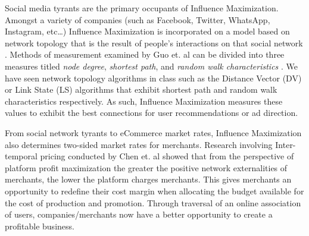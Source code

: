 \documentclass[12pt]{article}
\begin{document}
Social media tyrants are the primary occupants of Influence Maximization. 
Amongst a variety of companies (such as Facebook, Twitter, WhatsApp, Instagram, etc\ldots) Influence Maximization is incorporated on a model based on network topology that is the result of people's interactions on that social network \cite{9045797}. 
Methods of measurement examined by Guo et. al can be divided into three measures titled \emph{node degree}, \emph{shortest path}, and \emph{random walk characteristics} \cite{9045797}. 
We have seen network topology algorithms in class such as the Distance Vector (DV) or Link State (LS) algorithms that exhibit shortest path and random walk characteristics respectively. 
As such, Influence Maximization measures these values to exhibit the best connections for user recommendations or ad direction.

From social network tyrants to eCommerce market rates, Influence Maximization also determines two-sided market rates for merchants. 
Research involving Inter-temporal pricing conducted by Chen et. al \cite{9188557} showed that from the perspective of platform profit maximization the greater the positive network externalities of merchants, the lower the platform charges merchants. 
This gives merchants an opportunity to redefine their cost margin when allocating the budget available for the cost of production and promotion. 
Through traversal of an online association of users, companies/merchants now have a better opportunity to create a profitable business.



\begin{thebibliography}{99}	%
\nocite{*}

\end{thebibliography}
\end{document}
